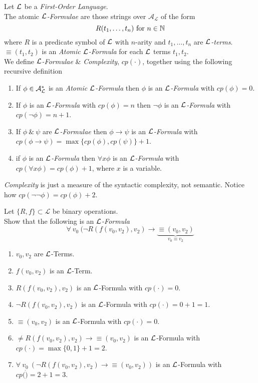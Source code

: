 \documentclass[11pt,a4paper]{article}
\begin{document}
Let $\mathcal{L}$ be a \textit{First-Order Language}.\\
The atomic $\mathcal{L}$\textit{-Formulae} are those strings over $\mathcal{A_L}$ of the form
$$R(t_1,\dots,t_n)\text{ for }n\in\mathbb{N}$$
where $R$ is a predicate symbol of $\mathcal{L}$ with $n$-arity and $t_1,\dots,t_n$ are $\mathcal{L}$\textit{-terms}.\\
\nb $\equiv(t_1,t_2)$ is an \textit{Atomic $\mathcal{L}$-Formula} for each $\mathcal{L}$ terms $t_1,t_2$.\\

We define \textit{$\mathcal{L}$-Formulae} \& \textit{Complexity}, $cp(\cdot)$, together using the following recursive definition
\begin{enumerate}
	\item If $\phi\in\mathcal{A}^*_{\mathcal{L}}$ is an \textit{Atomic $\mathcal{L}$-Formula} then $\phi$ is an \textit{$\mathcal{L}$-Formula} with $cp(\phi)=0$.
	\item If $\phi$ is an \textit{$\mathcal{L}$-Formula} with $cp(\phi)=n$ then $\neg\phi$ is an \textit{$\mathcal{L}$-Formula} with $cp(\neg\phi)=n+1$.
	\item If $\phi\ \&\ \psi$ are \textit{$\mathcal{L}$-Formulae} then $\phi\to\psi$ is an \textit{$\mathcal{L}$-Formula} with ${cp(\phi\to\psi)=\max\{cp(\phi),cp(\psi)\}+1}$.
	\item if $\phi$ is an \textit{$\mathcal{L}$-Formula} then $\forall x\phi$ is an \textit{$\mathcal{L}$-Formula} with $cp(\forall x\phi)=cp(\phi)+1$, where $x$ is a variable.
\end{enumerate}
\nb \textit{Complexity} is just a measure of the syntactic complexity, not semantic. Notice how ${cp(\neg\neg\phi)=cp(\phi)+2}$.\\


Let $\{R,f\}\subset\mathcal{L}$ be binary operations.\\
Show that the following is an \textit{$\mathcal{L}$-Formula}
$$\forall\ v_0\ (\neg R(f(v_0,v_2),v_2)\longrightarrow\underbrace{\equiv(v_0,v_2)}_{v_0\equiv v_2}$$
\begin{enumerate}
	\item $v_0,v_2$ are $\mathcal{L}$-Terms.
	\item $f(v_0,v_2)$ is an $\mathcal{L}$-Term.
	\item $R(f(v_0,v_2),v_2)$ is an $\mathcal{L}$-Formula with $cp(\cdot)=0$.
	\item $\neg R(f(v_0,v_2),v_2)$ is an $\mathcal{L}$-Formula with $cp(\cdot)=0+1=1$.
	\item $\equiv(v_0,v_2)$ is an $\mathcal{L}$-Formula with $cp(\cdot)=0$.
	\item $\neq R(f(v_0,v_2),v_2)\longrightarrow\equiv(v_0,v_2)$ is an $\mathcal{L}$-Formula with $cp(\cdot)=\max\{0,1\}+1=2$.
	\item $\forall\ v_0\ (\neg R(f(v_0,v_2),v_2)\longrightarrow\equiv(v_0,v_2))$ is an $\mathcal{L}$-Formula with $cp(\dot)=2+1=3$.
\end{enumerate}
\end{document}
